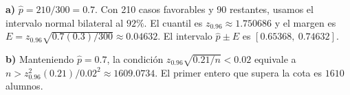 \textbf{a)} $\hat p=210/300=0.7$. Con 210 casos favorables y 90
restantes, usamos el intervalo normal bilateral al $92\%$.
El cuantil es $z_{0.96}\approx1.750686$ y el margen
es $E=z_{0.96}\sqrt{0.7(0.3)/300}\approx 0.04632$.
El intervalo $\hat p\pm E$ es $\boxed{[0.65368,\ 0.74632]}$.

\textbf{b)} Manteniendo $\hat p=0.7$, la condición
$z_{0.96}\sqrt{0.21/n}<0.02$ equivale a
$n>z_{0.96}^2(0.21)/0.02^2\approx 1609.0734$.
El primer entero que supera la cota es $\boxed{1610}$ alumnos.
